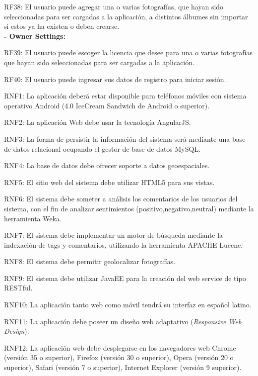 \documentclass{memoria}
\begin{document}
RF38: El usuario puede agregar una o varias fotografías, que hayan sido seleccionadas para ser cargadas a la aplicación, a distintos álbumes sin importar si estos ya ha existen o deben crearse.\\

\textbf{- Owner Settings:}

RF39: El usuario puede escoger la licencia que desee para una o varias fotografías que hayan sido seleccionadas para ser cargadas a la aplicación.\\


RF40: El usuario puede ingresar sus datos de registro para iniciar sesión.\\

\newpage


RNF1: La aplicación deberá estar disponible para teléfonos móviles con sistema operativo Android (4.0 IceCream Sandwich de Android o superior).

RNF2: La aplicación Web debe usar la tecnología AngularJS.

RNF3: La forma de persistir la información del sistema será mediante una base de datos relacional ocupando el gestor de base de datos MySQL.

RNF4: La base de datos debe ofrecer soporte a datos geoespaciales.

RNF5: El sitio web del sistema debe utilizar HTML5 para sus vistas.

RNF6: El sistema debe someter a análisis los comentarios de los usuarios del sistema, con el fin de analizar sentimientos (positivo,negativo,neutral) mediante la herramienta Weka.

RNF7: El sistema debe implementar un motor de búsqueda mediante la indexación de tags y comentarios, utilizando la  herramienta APACHE Lucene.

RNF8: El sistema debe permitir geolocalizar fotografías.

RNF9: El sistema debe utilizar JavaEE para la creación del web service de tipo RESTful.

RNF10: La aplicación tanto web como móvil tendrá su interfaz en español latino.

RNF11: La aplicación debe poseer un diseño web adaptativo (\textsl{Responsive Web Design}).

RNF12: La aplicación web debe desplegarse en los navegadores web Chrome (versión 35 o superior), Firefox (versión 30 o superior), Opera (versión 20 o superior), Safari (versión 7 o superior), Internet Explorer (versión 9 superior).
\end{document}
